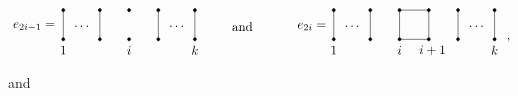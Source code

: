 \documentclass[11pt,a4paper,reqno,svgnames]{amsart}
\theoremstyle{plain}
\theoremstyle{definition}
\numberwithin{equation}{section}
\begin{document}
\begin{align*}
\begin{matrix}
\begin{tikzpicture}
\node at (-7.6,-0.45) {$\displaystyle e_{2i-1}= \color{black}$};
\node at (-6.3,-0.45) {$\displaystyle \cdots \color{black}$};
\draw (-6.8,0) -- (-6.8,-0.8);
\draw (-5.8,0) -- (-5.8,-0.8);
\draw (-4.2,0) -- (-4.2,-0.8);
\draw (-3.2,0) -- (-3.2,-0.8);
\filldraw [black] (-6.8,0) circle (1.2pt);
\filldraw [black] (-6.8,-0.8) circle (1.2pt);
\filldraw [black] (-5.8,0) circle (1.2pt);
\filldraw [black] (-5.8,-0.8) circle (1.2pt);
\filldraw [black] (-5.0,0) circle (1.2pt);
\filldraw [black] (-5.0,-0.8) circle (1.2pt);
\filldraw [black] (-4.2,0) circle (1.2pt);
\filldraw [black] (-4.2,-0.8) circle (1.2pt);
\filldraw [black] (-3.2,0) circle (1.2pt);
\filldraw [black] (-3.2,-0.8) circle (1.2pt);
\node at (-3.7,-0.45) {$\displaystyle \cdots \color{black}$};
\node at (-6.8,-1.1) {$\displaystyle 1 \color{black}$};
\node at (-5.0,-1.1) {$\displaystyle i \color{black}$};
\node at (-3.2,-1.1) {$\displaystyle k \color{black}$};
\node at (-1.9,-0.45) {$\displaystyle \text{and} \color{black}$};
\node at (-0.0,-0.45) {$\displaystyle e_{2i}= \color{black}$};
\node at (1.1,-0.45) {$\displaystyle \cdots \color{black}$};
\draw (0.6,0) -- (0.6,-0.8);
\draw (1.6,0) -- (1.6,-0.8);
\draw (2.4,0) -- (3.2,0);
\draw (2.4,0) -- (2.4,-0.8);
\draw (2.4,-0.8) -- (3.2,-0.8);
\draw (3.2,0) -- (3.2,-0.8);
\draw (4.0,0) -- (4.0,-0.8);
\draw (5.0,0) -- (5.0,-0.8);
\filldraw [black] (0.6,0) circle (1.2pt);
\filldraw [black] (0.6,-0.8) circle (1.2pt);
\filldraw [black] (1.6,0) circle (1.2pt);
\filldraw [black] (1.6,-0.8) circle (1.2pt);
\filldraw [black] (2.4,0) circle (1.2pt);
\filldraw [black] (2.4,-0.8) circle (1.2pt);
\filldraw [black] (3.2,0) circle (1.2pt);
\filldraw [black] (3.2,-0.8) circle (1.2pt);
\filldraw [black] (4,0) circle (1.2pt);
\filldraw [black] (4,-0.8) circle (1.2pt);
\filldraw [black] (5,0) circle (1.2pt);
\filldraw [black] (5,-0.8) circle (1.2pt);
\node at (4.5,-0.45) {$\displaystyle \cdots \color{black}$};
\node at (0.6,-1.1) {$\displaystyle 1 \color{black}$};
\node at (2.4,-1.1) {$\displaystyle i \color{black}$};
\node at (3.3,-1.1) {$\displaystyle i+1 \color{black}$};
\node at (5,-1.1) {$\displaystyle k \color{black}$};
\end{tikzpicture}
\end{matrix}\ ,
\end{align*}
and
\end{document}
